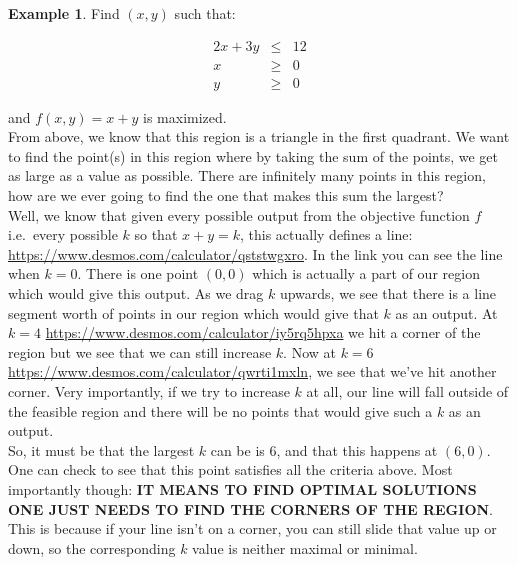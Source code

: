 \documentclass[10pt]{article}
\theoremstyle{definition}
\newtheorem{example}[equation]{Example}
\begin{document}
\begin{example}
Find $(x,y)$ such that:

\begin{eqnarray*}
2x+3y&\leq&12\\
x&\geq&0\\
y&\geq&0
\end{eqnarray*}

and $f(x,y)=x+y$ is maximized.\\

From above, we know that this region is a triangle in the first quadrant.  We want to find the point(s) in this region where by taking the sum of the points, we get as large as a value as possible.  There are infinitely many points in this region, how are we ever going to find the one that makes this sum the largest?\\

Well, we know that given every possible output from the objective function $f$ i.e.\ every possible $k$ so that $x+y=k$, this actually defines a line: \url{https://www.desmos.com/calculator/qststwgxro}.  In the link you can see the line when $k=0$.  There is one point $(0,0)$ which is actually a part of our region which would give this output.  As we drag $k$ upwards, we see that there is a line segment worth of points in our region which would give that $k$ as an output.  At $k=4$ \url{https://www.desmos.com/calculator/iy5rq5hpxa} we hit a corner of the region but we see that we can still increase $k$.  Now at $k=6$ \url{https://www.desmos.com/calculator/qwrti1mxln}, we see that we've hit another corner.  Very importantly, if we try to increase $k$ at all, our line will fall outside of the feasible region and there will be no points that would give such a $k$ as an output.\\

So, it must be that the largest $k$ can be is 6, and that this happens at $(6,0)$.  One can check to see that this point satisfies all the criteria above.  Most importantly though: {\bf IT MEANS TO FIND OPTIMAL SOLUTIONS ONE JUST NEEDS TO FIND THE CORNERS OF THE REGION}.  This is because if your line isn't on a corner, you can still slide that value up or down, so the corresponding $k$ value is neither maximal or minimal.


\end{example}
\end{document}
